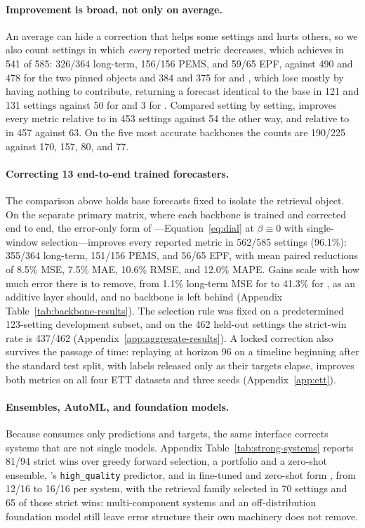 \paragraph{Improvement is broad, not only on average.}
An average can hide a correction that helps some settings and hurts others, so we
also count settings in which \emph{every} reported metric decreases, which \method{}
achieves in 541 of 585: 326/364 long-term, 156/156 PEMS, and 59/65 EPF, against 490
and 478 for the two pinned objects and 384 and 375 for \saraf{} and \raft{}, which
lose mostly by having nothing to contribute, returning a forecast identical to the
base in 121 and 131 settings against 50 for \residualknn{} and 3 for \method{}.
Compared setting by setting, \method{} improves every metric relative to
\analogknn{} in 453 settings against 54 the other way, and relative to
\residualknn{} in 457 against 63. On the five most accurate backbones the counts are
190/225 against 170, 157, 80, and 77.

\paragraph{Correcting 13 end-to-end trained forecasters.}
The comparison above holds base forecasts fixed to isolate the retrieval object. On
the separate primary matrix, where each backbone is trained and corrected end to
end, the error-only form of \method{}---Equation~\ref{eq:dial} at $\beta\equiv0$
with single-window selection---improves every reported metric in 562/585 settings
(96.1\%): 355/364 long-term, 151/156 PEMS, and 56/65 EPF, with mean paired
reductions of 8.5\% MSE, 7.5\% MAE, 10.6\% RMSE, and 12.0\% MAPE. Gains scale with
how much error there is to remove, from 1.1\% long-term MSE for \timexer{} to 41.3\%
for \informer{}, as an additive layer should, and no backbone is left behind
(Appendix Table~\ref{tab:backbone-results}). The selection rule was fixed on a
predetermined 123-setting development subset, and on the 462 held-out settings the
strict-win rate is 437/462 (Appendix~\ref{app:aggregate-results}). A locked
correction also survives the passage of time: replaying \timemixer{} at horizon 96
on a timeline beginning after the standard test split, with labels released only as
their targets elapse, improves both metrics on all four ETT datasets and three seeds
(Appendix~\ref{app:ett}).

\paragraph{Ensembles, AutoML, and foundation models.}
Because \method{} consumes only predictions and targets, the same interface corrects
systems that are not single models. Appendix Table~\ref{tab:strong-systems} reports
81/94 strict wins over greedy forward selection, a portfolio and a zero-shot
ensemble, \autogluon{}'s \texttt{high\_quality} predictor, and \chronosbolt{} in
fine-tuned and zero-shot form
\citep{caruana2004ensemble,autosklearn_portfolio_zeroshot,shchur2023autogluon,
ansari2024chronos}, from 12/16 to 16/16 per system, with the retrieval family
selected in 70 settings and 65 of those strict wins: multi-component systems and an
off-distribution foundation model still leave error structure their own machinery
does not remove.


